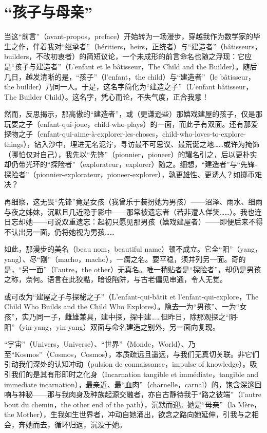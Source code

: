 \section{“孩子与母亲”}

当这“前言”（avant-propos，preface）开始转为一场漫步，穿越我作为数学家的毕生之作，伴着我对“继承者”（héritiers，heirs，正统者）与“建造者”（bâtisseurs，builders，不改初衷者）的简短议论，一个未成形的前言命名也随之浮现：它应是“孩子与建造者”（L'enfant et le bâtisseur，The Child and the Builder）。随后几日，越发清晰的是，“孩子”（l'enfant，the child）与“建造者”（le bâtisseur，the builder）乃同一人。于是，这名字简化为“建造之子”（L'enfant bâtisseur，The Builder Child）。这名字，凭心而论，不失气度，正合我意！

然而，反思揭示，那高傲的“建造者”，或（更谦逊些）那嬉戏建屋的孩子，仅是那玩耍之子（enfant-qui-joue，child-who-plays）的一面，而此子有双面。还有那爱探物之子（enfant-qui-aime-à-explorer-les-choses，child-who-loves-to-explore-things），钻入沙中，埋进无名泥泞，寻访最不可思议、最荒诞之地……或许为掩饰（哪怕仅对自己），我先以“先锋”（pionnier，pioneer）的耀名引之，后以更朴实却仍带光环的“探险者”（explorateur，explorer）随之。细想，“建造者”与“先锋-探险者”（pionnier-explorateur，pioneer-explorer），孰更雄性、更诱人？如掷币难决？

再细察，这无畏“先锋”竟是女孩（我曾乐于装扮她为男孩）——沼泽、雨水、细雨与夜之姊妹，沉默且几近隐于影中——那常被遗忘者（若非遭人佯笑……）。我也连日忘却她——可说双重遗忘：起初只愿见那男孩（嬉戏建屋者）——即便后来不得不认出另一面，仍将她视为男孩……

如此，那漫步的美名（beau nom，beautiful name）顿不成立。它全“阳”（yang，yang）、尽“刚”（macho，macho），一瘸之名。要平稳，须并列另一面。奇的是，“另一面”（l'autre，the other）无真名。唯一稍贴者是“探险者”，却仍是男孩之称，奈何。语言在此狡黠，暗设陷阱，与古老偏见串通，令人无觉。

或可改为“建屋之子与探秘之子”（L'enfant-qui-bâtit et l'enfant-qui-explore，The Child Who Builds and the Child Who Explores）。隐去一为“男孩”、一为“女孩”，实乃同一子，雌雄兼具，建中探，探中建……但昨日，除那观探之“阴-阳”（yin-yang，yin-yang）双面与命名建造之别外，另一面向复现。

“宇宙”（Univers，Universe）、“世界”（Monde，World）、乃至“Kosmos”（Cosmos，Cosmos），本质疏远且遥远，与我们无真切关联。非它们引动我们深处的认知冲动（pulsion de connaissance，impulse of knowledge）。吸引我们的是其有形即时之化身（Incarnation tangible et immédiate，tangible and immediate incarnation），最亲近、最“血肉”（charnelle，carnal）的，饱含深邃回响与神秘——那与我肉身及种族起源交融者，亦自古静待我于“路之彼端”（l'autre bout du chemin，the other end of the path），沉默而迎。她是“母亲”（la Mère，the Mother），生我如生世界者，冲动自她涌出，欲念之路向她延伸，引我与之相会，奔她而去，循环归返，沉没于她。


